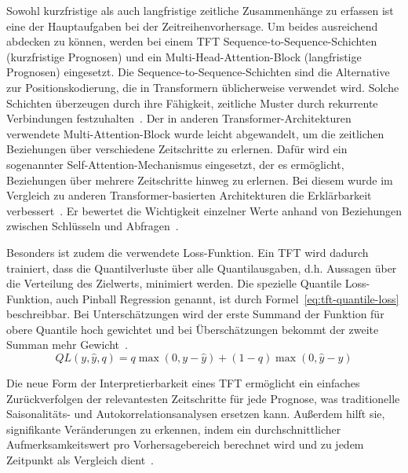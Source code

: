 Sowohl kurzfristige als auch langfristige zeitliche Zusammenhänge zu erfassen ist eine der Hauptaufgaben bei der Zeitreihenvorhersage.
Um beides ausreichend abdecken zu können, werden bei einem \ac{TFT} Sequence-to-Sequence-Schichten (kurzfristige Prognosen) und ein Multi-Head-Attention-Block (langfristige Prognosen) eingesetzt.
Die Sequence-to-Sequence-Schichten sind die Alternative zur Positionskodierung, die in Transformern üblicherweise verwendet wird.
Solche Schichten überzeugen durch ihre Fähigkeit, zeitliche Muster durch rekurrente Verbindungen festzuhalten~\cite{Labiadh.2023}.
Der in anderen Transformer-Architekturen verwendete Multi-Attention-Block wurde leicht abgewandelt, um die zeitlichen Beziehungen über verschiedene Zeitschritte zu erlernen.
Dafür wird ein sogenannter Self-Attention-Mechanismus eingesetzt, der es ermöglicht, Beziehungen über mehrere Zeitschritte hinweg zu erlernen.
Bei diesem wurde im Vergleich zu anderen Transformer-basierten Architekturen die Erklärbarkeit verbessert~\cite{Lim.19.12.2019}.
Er bewertet die Wichtigkeit einzelner Werte anhand von Beziehungen zwischen Schlüsseln und Abfragen~\cite{Labiadh.2023}.

Besonders ist zudem die verwendete Loss-Funktion.
Ein \ac{TFT} wird dadurch trainiert, dass die Quantilverluste über alle Quantilausgaben, d.h. Aussagen über die Verteilung des Zielwerts, minimiert werden.
Die spezielle Quantile Loss-Funktion, auch Pinball Regression genannt, ist durch Formel~\ref{eq:tft-quantile-loss} beschreibbar.
Bei Unterschätzungen wird der erste Summand der Funktion für obere Quantile hoch gewichtet und bei Überschätzungen bekommt der zweite Summan mehr Gewicht~\cite{Labiadh.2023}.
\begin{equation}
 \label{eq:tft-quantile-loss}
 QL(y, \hat{y}, q) = q \max(0, y - \hat{y}) + (1 - q) \max(0, \hat{y} - y)
\end{equation}

Die neue Form der Interpretierbarkeit eines \ac{TFT} ermöglicht ein einfaches Zurückverfolgen der relevantesten Zeitschritte für jede Prognose, was traditionelle Saisonalitäts- und Autokorrelationsanalysen ersetzen kann.
Außerdem hilft sie, signifikante Veränderungen zu erkennen, indem ein durchschnittlicher Aufmerksamkeitswert pro Vorhersagebereich berechnet wird und zu jedem Zeitpunkt als Vergleich dient~\cite{Labiadh.2023}.

